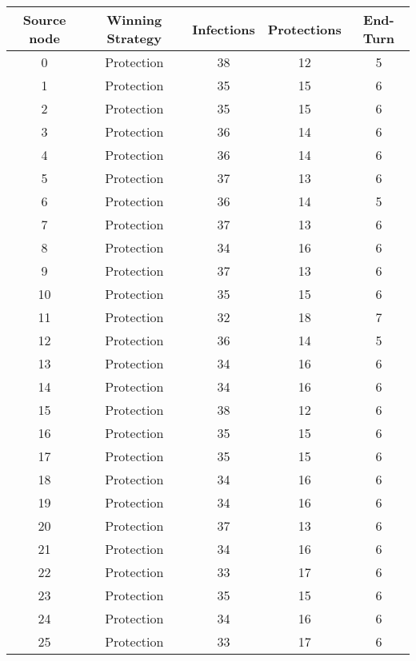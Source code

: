 \documentclass[results.tex]{subfiles}
\begin{document}
\begin{center}
  \begin{tabular}{| c || c | c | c | c |}
    \hline
    {\bfseries Source node} & {\bfseries Winning Strategy} & {\bfseries Infections} & {\bfseries Protections} & {\bfseries End-Turn} \\  %
    \hline\hline
    0 & Protection & 38 & 12 & 5 \\ 
    \hline
    1 & Protection & 35 & 15 & 6 \\ 
    \hline
    2 & Protection & 35 & 15 & 6 \\ 
    \hline
    3 & Protection & 36 & 14 & 6 \\ 
    \hline
    4 & Protection & 36 & 14 & 6 \\ 
    \hline
    5 & Protection & 37 & 13 & 6 \\ 
    \hline
    6 & Protection & 36 & 14 & 5 \\ 
    \hline
    7 & Protection & 37 & 13 & 6 \\ 
    \hline
    8 & Protection & 34 & 16 & 6 \\ 
    \hline
    9 & Protection & 37 & 13 & 6 \\ 
    \hline
    10 & Protection & 35 & 15 & 6 \\ 
    \hline
    11 & Protection & 32 & 18 & 7 \\ 
    \hline
    12 & Protection & 36 & 14 & 5 \\ 
    \hline
    13 & Protection & 34 & 16 & 6 \\ 
    \hline
    14 & Protection & 34 & 16 & 6 \\ 
    \hline
    15 & Protection & 38 & 12 & 6 \\ 
    \hline
    16 & Protection & 35 & 15 & 6 \\ 
    \hline
    17 & Protection & 35 & 15 & 6 \\ 
    \hline
    18 & Protection & 34 & 16 & 6 \\ 
    \hline
    19 & Protection & 34 & 16 & 6 \\ 
    \hline
    20 & Protection & 37 & 13 & 6 \\ 
    \hline
    21 & Protection & 34 & 16 & 6 \\ 
    \hline
    22 & Protection & 33 & 17 & 6 \\ 
    \hline
    23 & Protection & 35 & 15 & 6 \\ 
    \hline
    24 & Protection & 34 & 16 & 6 \\ 
    \hline
    25 & Protection & 33 & 17 & 6 \\ 

\end{tabular}
\end{center}
\end{document}
